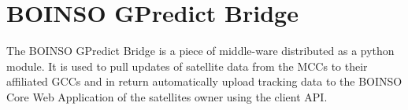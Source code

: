 \documentclass[BachelorPaper]{subfiles}
\begin{document}
\section{BOINSO GPredict Bridge}
The BOINSO GPredict Bridge is a piece of middle-ware distributed as a python module. It is used to pull updates of satellite data from the \acp{MCC} to their affiliated \acp{GCC} and in return automatically upload tracking data to the BOINSO Core Web Application of the satellites owner using the client \ac{API}.
\end{document}
